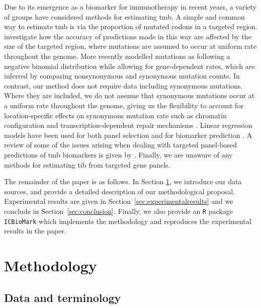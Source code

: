 \documentclass[../thesis.tex]{subfiles}
\begin{document}
Due to its emergence as a biomarker for immunotherapy in recent years, a variety of groups have considered methods for estimating \gls{tmb}. A simple and common way to estimate \gls{tmb} is via the proportion of mutated codons in a targeted region. \citet{budczies_optimizing_2019} investigate how the accuracy of predictions made in this way are affected by the size of the targeted region, where mutations are assumed to occur at uniform rate throughout the genome. More recently \citet{yao_ectmb_2020} modelled mutations as following a negative binomial distribution while allowing for gene-dependent rates, which are inferred by comparing nonsynonymous and synonymous mutation counts. In contrast, our method does not require data including synonymous mutations. Where they are included, we do not assume that synonymous mutations occur at a uniform rate throughout the genome, giving us the flexibility to account for location-specific effects on synonymous mutation rate such as chromatin configuration \citep{makova_effects_2015} and transcription-dependent repair mechanisms \citep{fong_intertwined_2013}. Linear regression models have been used for both panel selection \citep{lyu_mutation_2018} and for biomarker prediction \citep{guo_exon_2020}. A review of some of the issues arising when dealing with targeted panel-based predictions of \gls{tmb} biomarkers is given by \citet{wu_designing_2019}. Finally, we are unaware of any methods for estimating \gls{tib} from targeted gene panels. 

The remainder of the paper is as follows. In Section \ref{sec:methodology}, we introduce our data sources, and provide a detailed description of our methodological proposal. Experimental results are given in Section~\ref{sec:experimentalresults} and we conclude in Section~\ref{sec:conclusion}.  Finally, we also provide an \texttt{R} package \texttt{ICBioMark} \citep{bradley_icbiomark_2021} which implements the methodology and reproduces the experimental results in the paper. 




\section{Methodology}
\label{sec:methodology}
\subsection{Data and terminology \label{sec:dataterminology}}
\end{document}
